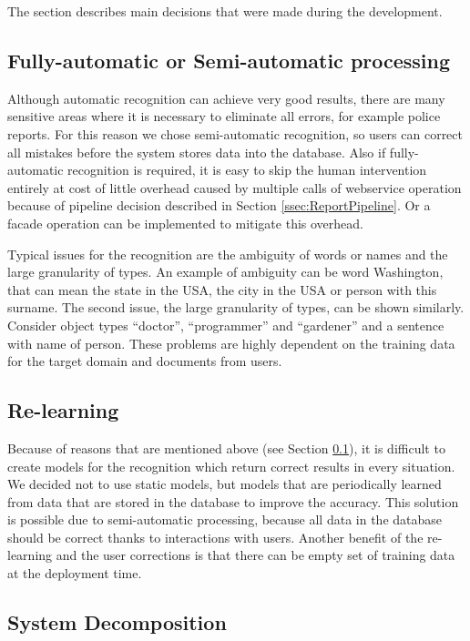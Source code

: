 
The section describes main decisions that were made during the development. 

\subsection{Fully-automatic or Semi-automatic processing}
\label{ssec:processing}

Although automatic recognition can achieve very good results, there are many
sensitive areas where it is necessary to eliminate all errors, for example
police reports. For this reason we chose semi-automatic recognition, so users
can correct all mistakes before the system stores data into the database. 
Also if fully-automatic recognition is required, it is easy
to skip the human intervention entirely at cost of little overhead caused by
multiple calls of webservice operation because of pipeline decision described in
Section \ref{ssec:ReportPipeline}. Or a facade operation can be implemented to
mitigate this overhead.

Typical issues for the recognition are the ambiguity of words or names and the
large granularity of types. An example of ambiguity can be word Washington, that
can mean the state in the USA, the city in the USA or person with this surname.
The second issue, the large granularity of types, can be shown similarly.
Consider object types ``doctor'', ``programmer'' and ``gardener'' and a sentence with
name of person. These problems are highly dependent on the training data for the
target domain and documents from users.

\subsection{Re-learning}

Because of reasons that are mentioned above (see Section \ref{ssec:processing}),
it is difficult to create models for the recognition which return correct
results in every situation. We decided not to use static models, but models that
are periodically learned from data that are stored in the database to improve
the accuracy. This solution is possible due to semi-automatic processing,
because all data in the database should be correct thanks to interactions with
users. Another benefit of the re-learning and the user corrections is that there
can be empty set of training data at the deployment time.

\subsection{System Decomposition}

